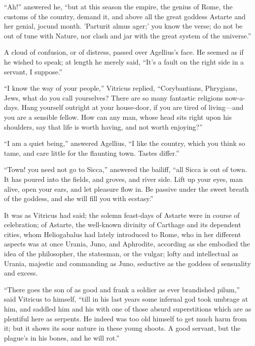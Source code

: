 ``Ah!'' answered he, ``but at this season the empire,
the genius of Rome, the customs of the country, demand it, and above
all the great goddess Astarte and her genial, jocund month. 'Parturit
almus ager;' you know the verse; do not be out of tune with Nature,
nor clash and jar with the great system of the universe.''

A cloud of confusion, or of distress, passed over Agellius's
face. He seemed as if he wished to speak; at length he merely said,
``It's a fault on the right side in a servant, I suppose.''

``I know the way of your people,'' Vitricus replied, ``Corybantians,
Phrygians, Jews, what do you call yourselves? There are so many
fantastic religions now-a-days. Hang yourself outright at your
house-door, if you are tired of living—and you are a sensible
fellow. How can any man, whose head sits right upon his shoulders, say that life is worth having, and not worth
enjoying?''

``I am a quiet being,'' answered Agellius, ``I like the
country, which you think so tame, and care little for the flaunting
town. Tastes differ.''

``Town! you need not go to Sicca,'' answered the bailiff,
``all Sicca is out of town. It has poured into the fields, and
groves, and river side. Lift up your eyes, man alive, open your ears,
and let pleasure flow in. Be passive under the sweet breath of the
goddess, and she will fill you with ecstasy.''

It was as Vitricus had said; the solemn feast-days of Astarte were
in course of celebration; of Astarte, the well-known divinity of
Carthage and its dependent cities, whom Heliogabalus had lately
introduced to Rome, who in her different aspects was at once Urania,
Juno, and Aphrodite, according as she embodied the idea of the
philosopher, the statesman, or the vulgar; lofty and intellectual as
Urania, majestic and commanding as Juno, seductive as the goddess of
sensuality and excess.

``There goes the son of as good and frank a soldier as ever
brandished pilum,'' said Vitricus to himself, ``till in his
last years some infernal god took umbrage at him, and saddled him and
his with one of those absurd superstitions which are as plentiful here
as serpents. He indeed was too old himself to get much harm from it;
but it shows its sour nature in these young shoots. A good servant,
but the plague's in his bones, and he will rot.''


